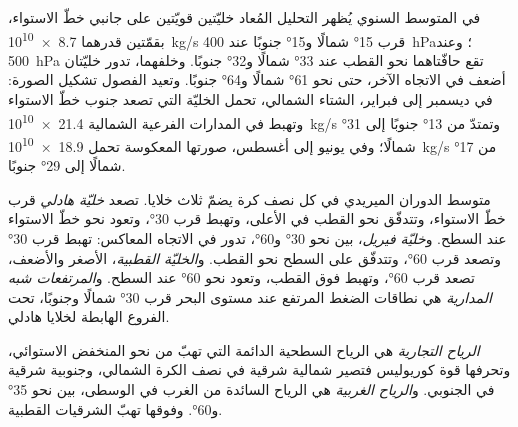 في المتوسط السنوي يُظهر التحليل المُعاد خليّتين قويّتين على جانبي خطّ الاستواء، بقمّتين قدرهما \qty{8.7e10}{kg/s} قرب \ang{15} شمالًا و\ang{15} جنوبًا عند \qty{400}{hPa}؛ وعند \qty{500}{hPa} تقع حافّتاهما نحو القطب عند \ang{33} شمالًا و\ang{32} جنوبًا. وخلفهما، تدور خليّتان أضعف في الاتجاه الآخر، حتى نحو \ang{61} شمالًا و\ang{64} جنوبًا. وتعيد الفصول تشكيل الصورة: في ديسمبر إلى فبراير، الشتاء الشمالي، تحمل الخليّة التي تصعد جنوب خطّ الاستواء وتهبط في المدارات الفرعية الشمالية \qty{21.4e10}{kg/s} وتمتدّ من \ang{13} جنوبًا إلى \ang{31} شمالًا؛ وفي يونيو إلى أغسطس، صورتها المعكوسة تحمل \qty{18.9e10}{kg/s} من \ang{17} شمالًا إلى \ang{29} جنوبًا.

\begin{definition}\label{def:b1:atmospheric-circulation:cells}
متوسط الدوران الميريدي في كل نصف كرة يضمّ ثلاث خلايا. تصعد \emph{خليّة هادلي} قرب خطّ الاستواء، وتتدفّق نحو القطب في الأعلى، وتهبط قرب \ang{30}، وتعود نحو خطّ الاستواء عند السطح. و\emph{خليّة فيريل}، بين نحو \ang{30} و\ang{60}، تدور في الاتجاه المعاكس: تهبط قرب \ang{30} وتصعد قرب \ang{60}، وتتدفّق على السطح نحو القطب. و\emph{الخليّة القطبية}، الأصغر والأضعف، تصعد قرب \ang{60}، وتهبط فوق القطب، وتعود نحو \ang{60} عند السطح. و\emph{المرتفعات شبه المدارية} هي نطاقات الضغط المرتفع عند مستوى البحر قرب \ang{30} شمالًا وجنوبًا، تحت الفروع الهابطة لخلايا هادلي.
\end{definition}

\begin{definition}\label{def:b1:atmospheric-circulation:winds}
\emph{الرياح التجارية} هي الرياح السطحية الدائمة التي تهبّ من  نحو المنخفض الاستوائي، وتحرفها قوة كوريوليس فتصير شمالية شرقية في نصف الكرة الشمالي، وجنوبية شرقية في الجنوبي. و\emph{الرياح الغربية} هي الرياح السائدة من الغرب في  الوسطى، بين نحو \ang{35} و\ang{60}. وفوقها تهبّ الشرقيات القطبية.
\end{definition}

